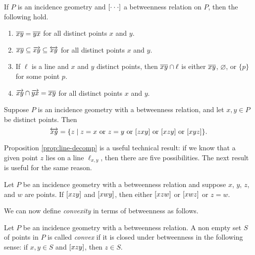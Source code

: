 \begin{prop}
If \(P\) is an incidence geometry and \([ \cdot \cdot \cdot ]\) a betweenness relation on \(P\), then the following hold.
\begin{enumerate}
\item \(\overline{xy} = \overline{yx}\) for all distinct points \(x\) and \(y\).
\item \(\overline{xy} \subseteq \overrightarrow{xy} \subseteq \overleftrightarrow{xy}\) for all distinct points \(x\) and \(y\).
\item If \(\ell\) is a line and \(x\) and \(y\) distinct points, then \(\overline{xy} \cap \ell\) is either \(\overline{xy}\), \(\varnothing\), or \(\{p\}\) for some point \(p\).
\item \(\overrightarrow{xy} \cap \overrightarrow{yx} = \overline{xy}\) for all distinct points \(x\) and \(y\).
\end{enumerate}
\end{prop}



\begin{prop}\label{prop:line-decomp}
Suppose \(P\) is an incidence geometry with a betweenness relation, and let \(x,y \in P\) be distinct points.
Then \[ \LINE{x}{y} = \{ z \mid z = x\ \mathrm{or}\ z = y\ \mathrm{or}\ \BETWEEN{z}{x}{y}\ \mathrm{or}\ \BETWEEN{x}{z}{y}\ \mathrm{or}\ \BETWEEN{x}{y}{z} \}. \]
\end{prop}

Proposition \ref{prop:line-decomp} is a useful technical result: if we know that a given point \(z\) lies on a line \(\ell_{x,y}\), then there are five possibilities.
The next result is useful for the same reason.

\begin{prop}
Let \(P\) be an incidence geometry with a betweenness relation and suppose \(x\), \(y\), \(z\), and \(w\) are points.
If \([ x z y ]\) and \([ x w y ]\), then either \([ x z w ]\) or \([ x w z ]\) or \(z = w\).
\end{prop}

We can now define \emph{convexity} in terms of betweenness as follows.

\begin{dfn}[Convexity]
Let \(P\) be an incidence geometry with a betweenness relation.
A non empty set \(S\) of points in \(P\) is called \emph{convex} if it is closed under betweenness in the following sense: if \(x,y \in S\) and \([ x z y ]\), then \(z \in S\).
\end{dfn}



